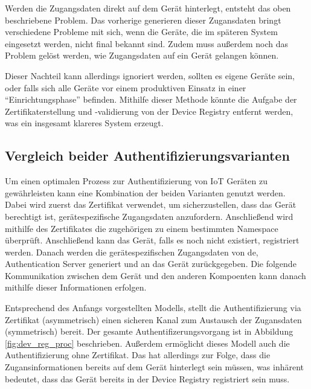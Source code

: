 Werden die Zugangsdaten direkt auf dem Gerät hinterlegt, entsteht das oben beschriebene Problem. Das vorherige generieren dieser Zugansdaten bringt verschiedene Probleme mit sich, wenn die Geräte, die im späteren System eingesetzt werden, nicht final bekannt sind. Zudem muss außerdem noch das Problem gelöst werden, wie Zugangsdaten auf ein Gerät gelangen können.

Dieser Nachteil kann allerdings ignoriert werden, sollten es eigene Geräte sein, oder falls sich alle Geräte vor einem produktiven Einsatz in einer \enquote{Einrichtungsphase} befinden. Mithilfe dieser Methode könnte die Aufgabe der Zertifikaterstellung und -validierung von der Device Registry entfernt werden, was ein insgesamt klareres System erzeugt.

\subsection{Vergleich beider Authentifizierungsvarianten}

Um einen optimalen Prozess zur Authentifizierung von IoT Geräten zu gewährleisten kann eine Kombination der beiden Varianten genutzt werden. Dabei wird zuerst das Zertifikat verwendet, um sicherzustellen, dass das Gerät berechtigt ist, gerätespezifische Zugangsdaten anzufordern. Anschließend wird mithilfe des Zertifikates die zugehörigen zu einem bestimmten Namespace überprüft. Anschließend kann das Gerät, falls es noch nicht existiert, registriert werden. Danach werden die gerätespezifischen Zugangsdaten von de, Authentication Server generiert und an das Gerät zurückgegeben. Die folgende Kommunikation zwischen dem Gerät und den anderen Kompoenten kann danach mithilfe dieser Informationen erfolgen.

Entsprechend des Anfangs vorgestellten Modells, stellt die Authentifizierung via Zertifikat (asymmetrisch) einen sicheren Kanal zum Austausch der Zugansdaten (symmetrisch) bereit. Der gesamte Authentifizerungsvorgang ist in Abbildung \vref{fig:dev_reg_proc} beschrieben. Außerdem ermöglicht dieses Modell auch die Authentifizierung ohne Zertifikat. Das hat allerdings zur Folge, dass die Zugansinformationen bereits auf dem Gerät hinterlegt sein müssen, was inhärent bedeutet, dass das Gerät bereits in der Device Registry registriert sein muss.

